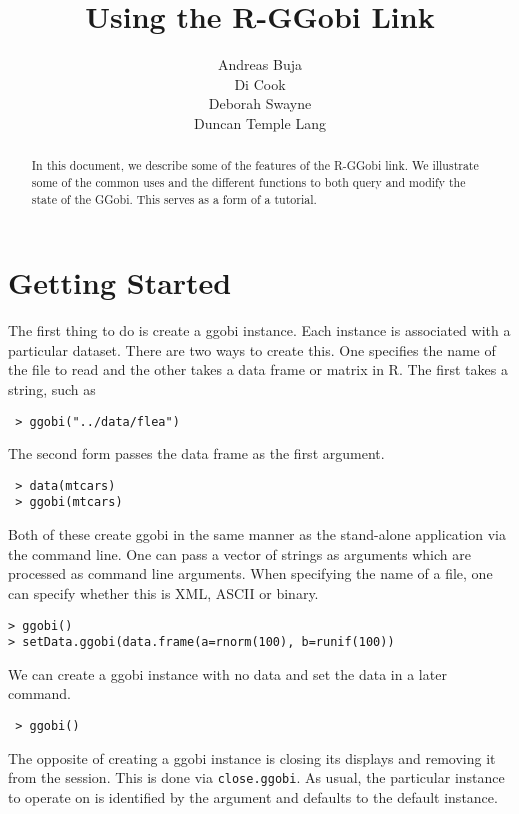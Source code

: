 \documentclass{article}
\title{Using the R-GGobi Link}
\author{Andreas Buja \\
Di Cook \\
Deborah Swayne \\
Duncan Temple Lang}
\def\SFunction#1{{\texttt{\red #1}}}
\begin{document}
\maketitle{}

\begin{abstract}
  In this document, we describe some of the features of the R-GGobi
  link. We illustrate some of the common uses and the different
  functions to both query and modify the state of the GGobi.  This
  serves as a form of a tutorial.
\end{abstract}

\section{Getting Started}
The first thing to do is create a ggobi instance.
Each instance is associated with a particular dataset.
There are two ways to create this.
One specifies the name of the file to read
and the other takes a data frame or matrix in R.
The first takes a string, such as
\begin{verbatim}
 > ggobi("../data/flea")
\end{verbatim}
The second form passes the data frame as the first argument.
\begin{verbatim}
 > data(mtcars)
 > ggobi(mtcars)
\end{verbatim}
Both of these create ggobi in the same manner as the stand-alone
application via the command line. 
One can pass a vector of strings as
arguments which are processed as command line arguments.  When
specifying the name of a file, one can specify whether this is XML,
ASCII or binary.

\begin{verbatim}
> ggobi()
> setData.ggobi(data.frame(a=rnorm(100), b=runif(100))
\end{verbatim}

We can create a ggobi instance with no data and set the data in a
later command.
\begin{verbatim}
 > ggobi()
\end{verbatim}

The opposite of creating a ggobi instance is closing its displays and
removing it from the session.  This is done via
\SFunction{close.ggobi}.  As usual, the particular instance to operate
on is identified by the  argument and defaults to the
default instance.
\end{document}
